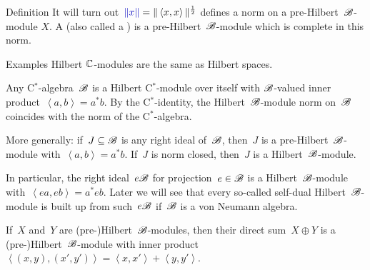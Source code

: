 \begin{parsec}
\begin{point}{Definition}
It will turn out~$\Define{\| x \|} = \| \left<x,x\right> \|^{\frac{1}{2}}$
        defines a norm on a pre-Hilbert~$\mathscr{B}$-module $X$.
A 
    (also called a )
    is a pre-Hilbert~$\mathscr{B}$-module
    which is complete in this norm.
\end{point}
\begin{point}{Examples}%
Hilbert $\mathbb{C}$-modules are the same as Hilbert spaces.

Any C$^*$-algebra~$\mathscr{B}$ is a Hilbert C$^*$-module over itself
    with $\mathscr{B}$-valued inner product~$\left<a,b\right> = a^*b$.
By the C$^*$-identity, the Hilbert~$\mathscr{B}$-module
    norm on~$\mathscr{B}$ coincides with
    the norm of the C$^*$-algebra.

More generally: if~$J \subseteq \mathscr{B}$
    is any right ideal of~$\mathscr{B}$,
    then~$J$ is a pre-Hilbert~$\mathscr{B}$-module
    with~$\left<a,b\right> = a^*b$.
If~$J$ is norm closed, then~$J$ is a Hilbert~$\mathscr{B}$-module.

In particular, the right ideal~$e \mathscr{B}$ for projection~$e \in \mathscr{B}$
    is a Hilbert~$\mathscr{B}$-module with~$\left<ea,eb\right> = a^*eb$.
Later we will see that every so-called self-dual
    Hilbert~$\mathscr{B}$-module is built up from such~$e \mathscr{B}$
    if~$\mathscr{B}$ is a von Neumann algebra.
    
If~$X$ and~$Y$ are (pre-)Hilbert~$\mathscr{B}$-modules,
    then their direct sum~$X \oplus Y$
    is a (pre-)Hilbert~$\mathscr{B}$-module
    with inner product~$\left<(x,y), (x',y')\right>
                = \left<x,x'\right>+\left<y,y'\right>$.
\end{point}
\end{parsec}
